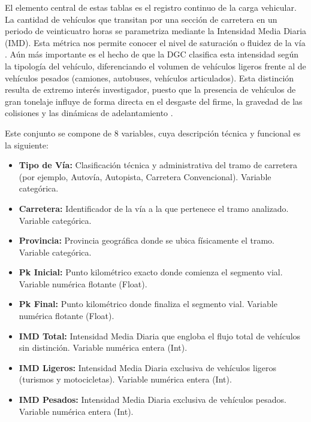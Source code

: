 \documentclass[twoside,a4paper,12pt,onecolumn,openany]{book}
\begin{document}
\vspace{0.5cm}

El elemento central de estas tablas es el registro continuo de la carga vehicular. La cantidad de vehículos que transitan por una sección de carretera en un periodo de veinticuatro horas se parametriza mediante la Intensidad Media Diaria (IMD). Esta métrica nos permite conocer el nivel de saturación o fluidez de la vía \cite{plan_aforos}. Aún más importante es el hecho de que la DGC clasifica esta intensidad según la tipología del vehículo, diferenciando el volumen de vehículos ligeros frente al de vehículos pesados \cite{plan_aforos} (camiones, autobuses, vehículos articulados). Esta distinción resulta de extremo interés investigador, puesto que la presencia de vehículos de gran tonelaje influye de forma directa en el desgaste del firme, la gravedad de las colisiones y las dinámicas de adelantamiento \cite{ingenieriacarreteras}.

\vspace{0.5cm}

Este conjunto se compone de 8 variables, cuya descripción técnica y funcional es la siguiente:

\begin{itemize}
\item \textbf{Tipo de Vía:} Clasificación técnica y administrativa del tramo de carretera (por ejemplo, Autovía, Autopista, Carretera Convencional). Variable categórica.

\item \textbf{Carretera:} Identificador de la vía a la que pertenece el tramo analizado. Variable categórica.

\item \textbf{Provincia:} Provincia geográfica donde se ubica físicamente el tramo. Variable categórica.

\item \textbf{Pk Inicial:} Punto kilométrico exacto donde comienza el segmento vial. Variable numérica flotante (Float).

\item \textbf{Pk Final:} Punto kilométrico donde finaliza el segmento vial. Variable numérica flotante (Float).

\item \textbf{IMD Total:} Intensidad Media Diaria que engloba el flujo total de vehículos sin distinción. Variable numérica entera (Int).

\item \textbf{IMD Ligeros:} Intensidad Media Diaria exclusiva de vehículos ligeros (turismos y motocicletas). Variable numérica entera (Int).

\item \textbf{IMD Pesados:} Intensidad Media Diaria exclusiva de vehículos pesados. Variable numérica entera (Int).
\end{itemize}
\end{document}
